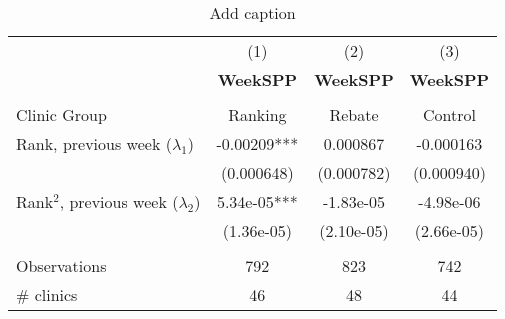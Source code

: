 \begin{table}[htbp]
  \centering
  \caption{Add caption}
    \begin{tabular}{lccc}
          & (1)   & (2)   & (3) \\
          & \textbf{WeekSPP} & \textbf{WeekSPP} & \textbf{WeekSPP} \\
          &       &       &  \\
    Clinic Group & Ranking & Rebate & Control \\
    Rank, previous week ($\lambda_1$) & -0.00209*** & 0.000867 & -0.000163 \\
          & (0.000648) & (0.000782) & (0.000940) \\
    Rank$^2$, previous week ($\lambda_2$) & 5.34e-05*** & -1.83e-05 & -4.98e-06 \\
          & (1.36e-05) & (2.10e-05) & (2.66e-05) \\
          &       &       &  \\
    Observations & 792   & 823   & 742 \\
    \# clinics & 46    & 48    & 44 \\
    \end{tabular}%
  \label{tab:addlabel}%
\end{table}%
